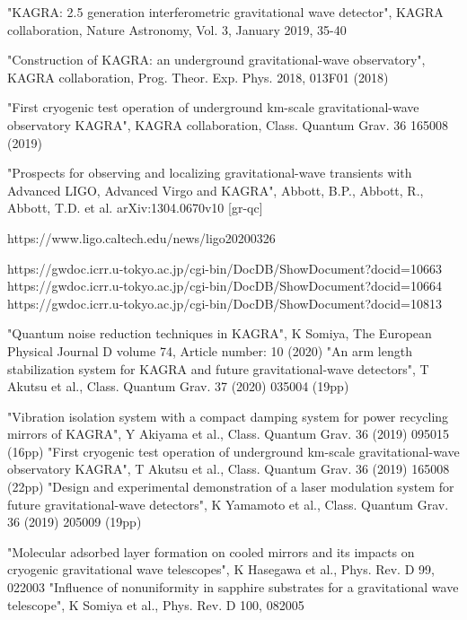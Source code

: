 
\begin{thebibliography}{9}

 "KAGRA: 2.5 generation interferometric gravitational wave detector",
KAGRA collaboration, Nature Astronomy, Vol. 3, January 2019, 35-40

 "Construction of KAGRA: an underground gravitational-wave observatory",
KAGRA collaboration,
Prog. Theor. Exp. Phys. 2018, 013F01 (2018)

 "First cryogenic test operation of underground km-scale gravitational-wave observatory KAGRA",
KAGRA collaboration, Class. Quantum Grav. 36 165008 (2019)


 "Prospects for observing and localizing gravitational-wave transients with Advanced LIGO, Advanced Virgo and KAGRA",
Abbott, B.P., Abbott, R., Abbott, T.D. et al. arXiv:1304.0670v10 [gr-qc]

 https://www.ligo.caltech.edu/news/ligo20200326

 https://gwdoc.icrr.u-tokyo.ac.jp/cgi-bin/DocDB/ShowDocument?docid=10663
 https://gwdoc.icrr.u-tokyo.ac.jp/cgi-bin/DocDB/ShowDocument?docid=10664
 https://gwdoc.icrr.u-tokyo.ac.jp/cgi-bin/DocDB/ShowDocument?docid=10813

 "Quantum noise reduction techniques in KAGRA", K Somiya, The European Physical Journal D volume 74, Article number: 10 (2020)
 "An arm length stabilization system for KAGRA and future gravitational-wave detectors", T Akutsu et al., Class. Quantum Grav. 37 (2020) 035004 (19pp)

 "Vibration isolation system with a compact damping system for power recycling mirrors of KAGRA", Y Akiyama et al., Class. Quantum Grav. 36 (2019) 095015 (16pp)
 "First cryogenic test operation of underground km-scale gravitational-wave observatory KAGRA", T Akutsu et al., Class. Quantum Grav. 36 (2019) 165008 (22pp)
 "Design and experimental demonstration of a laser modulation system for future gravitational-wave detectors", K Yamamoto et al., Class. Quantum Grav. 36 (2019) 205009 (19pp)

 "Molecular adsorbed layer formation on cooled mirrors and its impacts on cryogenic gravitational wave telescopes", K Hasegawa et al., Phys. Rev. D 99, 022003
 "Influence of nonuniformity in sapphire substrates for a gravitational wave telescope", K Somiya et al., Phys. Rev. D 100, 082005


\end{thebibliography}
